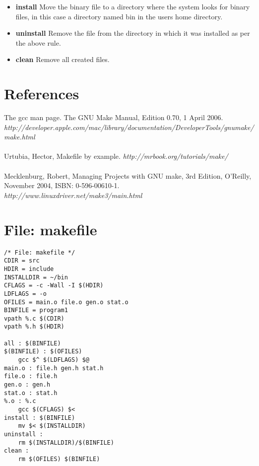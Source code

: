 \documentclass[a4paper,10pt]{article}
\begin{document}
\begin{itemize}
\item \textbf{install} Move the binary file to a directory where the system looks for binary files, in this case a directory named bin in the users home directory.
\item \textbf{uninstall} Remove the file from the directory in which it was installed as per the above rule.
\item \textbf{clean} Remove all created files.
\end{itemize}

\newpage
\appendix
\section{References}
The gcc man page.
The GNU Make Manual, Edition 0.70, 1 April 2006. \textit{http://developer.apple.com/mac/library/documentation/DeveloperTools/gnumake/ \\make.html}
\\
\\
Urtubia, Hector, Makefile by example. \textit{http://mrbook.org/tutorials/make/}
\\
\\
Mecklenburg, Robert, Managing Projects with GNU make, 3rd Edition, O'Reilly, November 2004, ISBN: 0-596-00610-1. \textit{http://www.linuxdriver.net/make3/main.html}

\section{File: makefile}
\begin{verbatim}
/* File: makefile */
CDIR = src
HDIR = include
INSTALLDIR = ~/bin
CFLAGS = -c -Wall -I $(HDIR)
LDFLAGS = -o
OFILES = main.o file.o gen.o stat.o
BINFILE = program1
vpath %.c $(CDIR)
vpath %.h $(HDIR)

all : $(BINFILE)
$(BINFILE) : $(OFILES)
    gcc $^ $(LDFLAGS) $@
main.o : file.h gen.h stat.h 
file.o : file.h
gen.o : gen.h
stat.o : stat.h
%.o : %.c
    gcc $(CFLAGS) $<
install : $(BINFILE)
    mv $< $(INSTALLDIR)
uninstall :
    rm $(INSTALLDIR)/$(BINFILE)
clean : 
    rm $(OFILES) $(BINFILE)
\end{verbatim}
\end{document}
